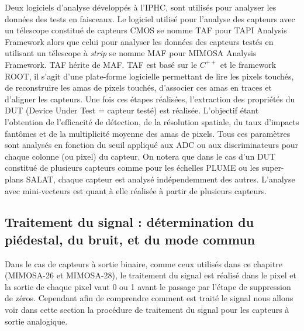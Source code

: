  Deux logiciels d'analyse d\'evelopp\'es \`a l'IPHC, sont utilis\'es pour analyser les donn\'ees des tests en faisceaux. Le logiciel utilis\'e pour l'analyse des capteurs avec un t\'elescope constitu\'e de capteurs CMOS se nomme TAF pour TAPI Analysis Framework alors que celui pour analyser les donn\'ees des capteurs test\'es en utilisant un t\'elescope \`a \textit{strip} se nomme MAF pour MIMOSA Analysis Framework. TAF h\'erite de MAF. TAF est bas\'e sur le $C^{++}$ et le framework ROOT, il s'agit d'une plate-forme logicielle permettant de lire les pixels touch\'es, de reconstruire les amas de pixels touch\'es, d'associer ces amas en traces et d'aligner les capteurs. Une fois ces \'etapes r\'ealis\'ees, l'extraction des propri\'et\'es du DUT (Device Under Test = capteur test\'e) est r\'ealis\'ee. L'objectif \'etant l'obtention de l'efficacit\'e de d\'etection, de la r\'esolution spatiale, du taux d'impacts fant\^omes et de la multiplicit\'e moyenne des amas de pixels. Tous ces param\`etres sont analys\'es en fonction du seuil appliqu\'e aux ADC ou aux discriminateurs pour chaque colonne (ou pixel) du capteur. On notera que dans le cas d'un DUT constitu\'e de plusieurs capteurs comme pour les \'echelles PLUME ou les super-plans SALAT, chaque capteur est analys\'e ind\'ependemment des autres. L'analyse avec mini-vecteurs est quant \`a elle r\'ealis\'ee \`a partir de plusieurs capteurs.



  \subsection{Traitement du signal : d\'etermination du pi\'edestal, du bruit, et du mode commun}
   
   Dans le cas de capteurs \`a sortie binaire, comme ceux utilis\'es dans ce chapitre (MIMOSA-26 et MIMOSA-28), le traitement du signal est r\'ealis\'e dans le pixel et la sortie de chaque pixel vaut 0 ou 1 avant le passage par l'\'etape de suppression de z\'eros. Cependant afin de comprendre comment est trait\'e le signal nous allons voir dans cette section la proc\'edure de traitement du signal pour les capteurs \`a sortie analogique.
   
